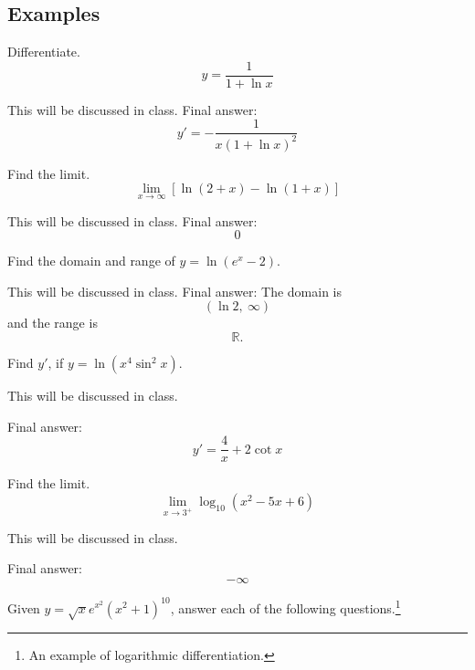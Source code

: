 \documentclass[12pt,addpoints, answers, fleqn]{exam}
\begin{document}
\subsection{Examples}

\begin{questions}
\question Differentiate.
\[
y = \frac{1}{1 + \ln x}
\]
\begin{solution}
This will be discussed in class. Final answer:
\[
y' = -\frac{1}{x\left( 1 + \ln x \right)^2}
\]
\end{solution}


\question Find the limit.
\[
\mathop {\lim }\limits_{x \to \infty} \left[ \ln \left( 2 + x \right) - \ln \left( 1 + x \right) \right]
\]
\begin{solution}
This will be discussed in class. Final answer:
\[
0
\]
\end{solution}


\question Find the domain and range of $y = \ln \left( e^x - 2 \right)$.
\begin{solution}
This will be discussed in class. Final answer:
The domain is
\[
\left( \ln 2 , \ \infty \right)
\]
and the range is
\[
\mathbb{R}.
\]
\end{solution}


\question Find $y'$, if $y = \ln \left( x^4 \sin^2 x \right)$.
\begin{solution}
This will be discussed in class.

Final answer:
\[
y ' = \frac{4}{x} + 2 \cot x
\]
\end{solution}


\question Find the limit.
\[
\mathop {\lim }\limits_{x \to 3^+} \log_{10} \left( x^2 -5x+6\right)
\]
\begin{solution}
This will be discussed in class.

Final answer:
\[
-\infty
\]
\end{solution}


\question Given $y = \sqrt{x} e^{x^2} \left(x^2 + 1 \right)^{10}$, answer each of the following questions.\footnote{An example of logarithmic differentiation.}
\end{questions}
\end{document}
